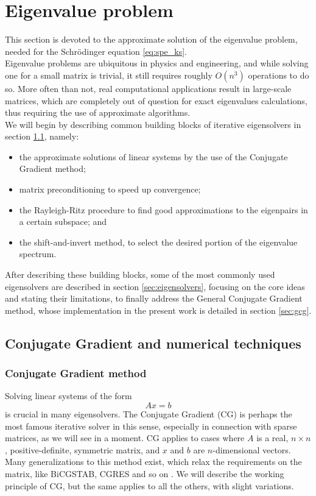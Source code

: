 \section{Eigenvalue problem}
This section is devoted to the approximate solution of the eigenvalue problem, needed for the Schr\"odinger equation \eqref{eq:spe_ks}. 
\\Eigenvalue problems are ubiquitous in physics and engineering, and while solving one for a small matrix is trivial, it still requires roughly $O(n^3)$ operations \cite{golub13} to do so. More often than not, real computational applications result in large-scale matrices, which are completely out of question for exact eigenvalues calculations, thus requiring the use of approximate algorithms. 
\\We will begin by describing common building blocks of iterative eigensolvers in section \ref{sec:techniques}, namely:
\begin{itemize}
    \item the approximate solutions of linear systems by the use of the Conjugate Gradient method;
    \item matrix preconditioning to speed up convergence;
    \item the Rayleigh-Ritz procedure to find good approximations to the eigenpairs in a certain subspace; and
    \item the shift-and-invert method, to select the desired portion of the eigenvalue spectrum.
\end{itemize}
After describing these building blocks, some of the most commonly used eigensolvers are described in section \ref{sec:eigensolvers}, focusing on the core ideas and stating their limitations, to finally address the General Conjugate Gradient method, whose implementation in the present work is detailed in section \ref{sec:gcg}.
\subsection{Conjugate Gradient and numerical techniques}
\label{sec:techniques}
\subsubsection{Conjugate Gradient method}
\label{sec:cg}
Solving linear systems of the form
\begin{equation}
    \label{eq:lin_sys}
    Ax = b
\end{equation}
is crucial in many eigensolvers. The Conjugate Gradient (CG) is perhaps the most famous iterative solver in this sense, especially in connection with sparse matrices, as we will see in a moment.
CG applies to cases where $A$ is a real, $n\times n$, positive-definite, symmetric matrix, and $x$ and $b$ are $n$-dimensional vectors.
\\Many generalizations to this method exist, which relax the requirements on the matrix, like BiCGSTAB, CGRES and so on \cite{Saad1992}. We will describe the working principle of CG, but the same applies to all the others, with slight variations.
